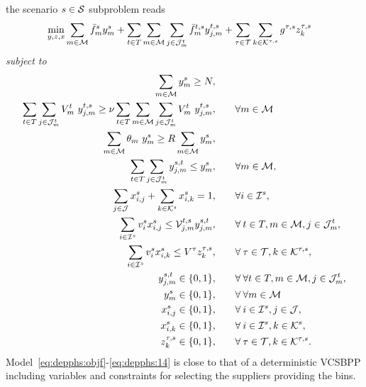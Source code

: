 \documentclass[a4paper,11pt]{article}
\begin{document}
	the scenario $ s \in {\cal S}$ subproblem reads
	\begin{equation}
	\begin{split}
		\min_{y,z,x} & \sum_{m \in \cal M} \bar{f}^s_m y^s_{m} + \sum_{t \in T} \sum_{m \in {{\cal M}}} \sum_{j \in {\cal J}_{m}^t} \bar{f}_{m}^{t,s} y^{t,s}_{j,m} + \sum_{\tau \in \cal T} \sum_{k \in {\cal K}^{\tau,s}} g^{\tau,s} z_k^{\tau,s}\label{eq:depphs:objf}
	\end{split}
	\end{equation}
	\textit{subject to}
	\begin{alignat}{2}
		\sum\limits_{m \in \cal {M}} y^s_{m}\geq{N}, & \qquad
		\label{eq:depphs:3}\\
		\sum\limits_{t \in T} \sum\limits_{j \in {\cal J}^t_{m}} V_{m}^{t} \ y^{t,s}_{j,m} \geq \nu \sum\limits_{t \in T} \sum\limits_{m \in {\cal M}} \sum\limits_{j \in {\cal J}^t_{m}} V_{m}^{t} \ y^{t,s}_{j,m}, & \qquad \forall m \in {\cal M}
		\label{eq:depphs:3.2}\\
		\sum\limits_{m \in {\cal M}} \theta_{m} \ y^s_{m} \geq R \sum\limits_{m \in {\cal M}} y^s_{m}, & \qquad \label{eq:depphs:4}\\
		\sum\limits_{t \in T} \sum\limits_{j \in {\cal J}^t_{m}} y^{s,t}_{j,m} \leq y^s_{m}, & \qquad \forall m \in \cal M, \label{eq:depphs:5}\\
		\sum\limits_{j \in \cal J}x_{i,j}^{s} + \sum\limits_{k \in {\cal K}^{s}}x_{i,k}^{s} = 1, & \qquad \forall i \in {\cal I}^{s}, \label{eq:depphs:9}\\
		\sum\limits_{i \in {\cal I}^{s}}v_i^{s} x_{i,j}^{s} \leq {\cal V}_{j,m}^{t,s} y^{s,t}_{j,m}, & \qquad \forall \: t \in T, m\in{{\cal M}}, j \in {\cal J}^t_{m}, \label{eq:depphs:10}\\
		\sum\limits_{i \in {\cal I}^{s}} v_i^{s} x_{i,k}^{s} \leq V^{\tau} z_k^{\tau,s}, & \qquad \forall \: \tau \in {\cal T}, k \in {\cal K}^{\tau,s}, \label{eq:depphs:11}\\
		y^{s,t}_{j,m} \in \{0, 1\}, & \qquad \forall \: \forall t \in T, m \in {\cal M}, j \in {\cal J}^t_{m}, \label{eq:depphs:6}\\
		y^s_{m} \in \{0, 1\}, & \qquad \forall \: \forall m \in \cal M \label{eq:depphs:7}\\
		x_{i,j}^{s} \in \{0, 1\}, & \qquad \forall \: i \in {\cal I}^{s}, j \in {\cal J}, \label{eq:depphs:12}\\
		x_{i,k}^{s} \in \{0, 1\}, & \qquad \forall \: i \in {\cal I}^{s}, k \in {\cal K}^{s}, \label{eq:depphs:13}\\
		z_k^{\tau,s} \in \{0, 1\}, & \qquad \forall \: \tau \in {\cal T} , k \in {\cal K}^{\tau,s}. \label{eq:depphs:14}
	\end{alignat}
	Model~\eqref{eq:depphs:objf}-\eqref{eq:depphs:14} is close to that of a deterministic VCSBPP including variables and constraints for selecting the suppliers providing the bins.
	
\end{document}

